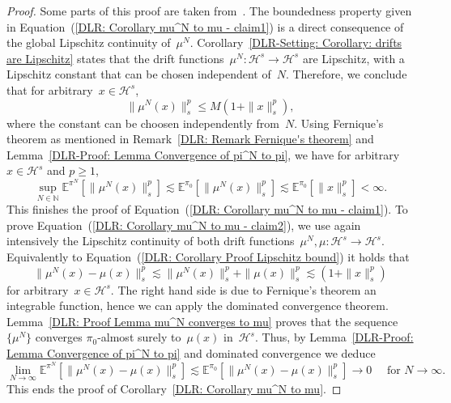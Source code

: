 \begin{proof}
  Some parts of this proof are taken from~\autocite[Lemma 4.7]{Pillai2012}. The boundedness property given in Equation~(\ref{DLR: Corollary mu^N to mu - claim1}) is a direct consequence of the global Lipschitz continuity of~$\mu^N$. Corollary~\ref{DLR-Setting: Corollary: drifts are Lipschitz} states that the drift functions~$\mu^N: \mathcal{H}^s \to \mathcal{H}^s$ are Lipschitz, with a Lipschitz constant that can be chosen independent of~$N$. Therefore, we conclude that for arbitrary~$x \in \mathcal{H}^s$,
 \begin{equation}
   \label{DLR: Corollary Proof Lipschitz bound}
  \| \mu^N(x) \|_s^p \leq M (1 + \|x\|^p_s),
 \end{equation}
 where the constant can be choosen independently from~$N$. Using Fernique's theorem as mentioned in Remark~\ref{DLR: Remark Fernique's theorem} and Lemma~\ref{DLR-Proof: Lemma Convergence of pi^N to pi}, we have for arbitrary~$x \in \mathcal{H}^s$ and $p \geq 1$,
 \begin{equation*}
   \sup_{N \in \mathbb{N}}  \mathbb{E}^{\pi^N}[\| \mu^N(x) \|_s^p] \lesssim  \mathbb{E}^{\pi_0}[\| \mu^N(x) \|_s^p] \lesssim \mathbb{E}^{\pi_0}[\|  x \|_s^p] < \infty.
 \end{equation*}
 This finishes the proof of Equation~(\ref{DLR: Corollary mu^N to mu - claim1}). To prove Equation~(\ref{DLR: Corollary mu^N to mu - claim2}), we use again intensively the Lipschitz continuity of both drift functions~$\mu^N, \mu: \mathcal{H}^s \to \mathcal{H}^s$. Equivalently to Equation~(\ref{DLR: Corollary Proof Lipschitz bound}) it holds that
 \begin{equation*}
  \| \mu^N (x) - \mu(x) \|_s^p \lesssim \|\mu^N(x)\|_s^p + \|\mu(x)\|_s^p \lesssim (1 + \|x\|^p_s)
 \end{equation*}
 for arbitrary~$x \in \mathcal{H}^s$. The right hand side is due to Fernique's theorem an integrable function, hence we can apply the dominated convergence theorem. Lemma~\ref{DLR: Proof Lemma mu^N converges to mu} proves that the sequence~$\{ \mu^N \}$ converges $\pi_0$-almost surely to~$\mu(x)$ in~$\mathcal{H}^s$. Thus, by  Lemma~\ref{DLR-Proof: Lemma Convergence of pi^N to pi} and dominated convergence we deduce
 \begin{equation*}
   \lim_{N \to \infty} \mathbb{E}^{\pi^N}[\| \mu^N (x) - \mu(x) \|_s^p ] \lesssim \mathbb{E}^{\pi_0}[\| \mu^N (x) - \mu(x) \|_s^p ] \to 0 \quad \text{ for } N \to \infty.
 \end{equation*}
 This  ends the proof of Corollary~\ref{DLR: Corollary mu^N to mu}.

\end{proof}








